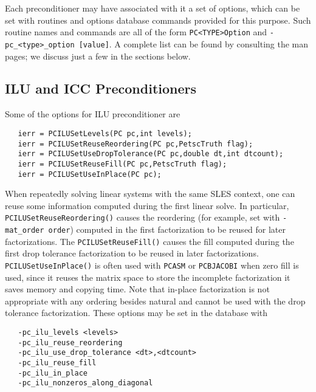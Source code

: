 Each preconditioner may have associated with it a set of options,
which can be set with routines and options database commands provided
for this purpose.  Such routine names and commands are all of the form
{\tt PC<TYPE>Option} and {\tt -pc\_<type>\_option [value]}.  A
complete list can be found by consulting the man pages; we discuss
just a few in the sections below.

\subsection{ILU and ICC Preconditioners}
\label{sec:ilu_icc}

Some of the options for ILU preconditioner are 
\begin{verbatim}
   ierr = PCILUSetLevels(PC pc,int levels);
   ierr = PCILUSetReuseReordering(PC pc,PetscTruth flag);
   ierr = PCILUSetUseDropTolerance(PC pc,double dt,int dtcount);
   ierr = PCILUSetReuseFill(PC pc,PetscTruth flag);
   ierr = PCILUSetUseInPlace(PC pc); 
\end{verbatim}
 
 

When repeatedly solving linear systems with the same SLES
context, one can reuse some information  computed
during the first linear solve.
In particular, {\tt PCILUSetReuseReordering()} causes the reordering  (for example, set with 
{\tt -mat\_order order}) computed in the first factorization to be reused
for later factorizations.  
The {\tt  PCILUSetReuseFill()} causes the 
fill computed during the first drop tolerance factorization to be reused
in later factorizations. {\tt PCILUSetUseInPlace()} is often used with 
{\tt PCASM} or {\tt PCBJACOBI} when zero fill is used, since it reuses the 
matrix space to store the incomplete factorization it saves memory and 
copying time. Note that in-place factorization is not appropriate with 
any ordering besides natural and cannot be used with the drop tolerance
factorization. These options may be set in the database with 
\begin{verbatim}
   -pc_ilu_levels <levels>
   -pc_ilu_reuse_reordering
   -pc_ilu_use_drop_tolerance <dt>,<dtcount>
   -pc_ilu_reuse_fill
   -pc_ilu_in_place
   -pc_ilu_nonzeros_along_diagonal
\end{verbatim}
 
 
 

